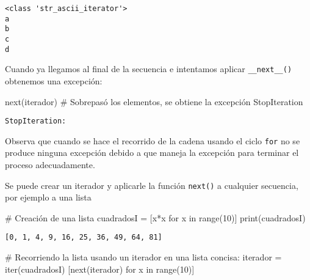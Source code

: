\documentclass[
  letterpaper,
  DIV=11,
  numbers=noendperiod]{scrreprt}
\newenvironment{Shaded}{\begin{snugshade}}{\end{snugshade}}
\newcommand{\BuiltInTok}[1]{\textcolor[rgb]{0.00,0.23,0.31}{#1}}
\newcommand{\CommentTok}[1]{\textcolor[rgb]{0.37,0.37,0.37}{#1}}
\newcommand{\ControlFlowTok}[1]{\textcolor[rgb]{0.00,0.23,0.31}{#1}}
\newcommand{\DecValTok}[1]{\textcolor[rgb]{0.68,0.00,0.00}{#1}}
\newcommand{\KeywordTok}[1]{\textcolor[rgb]{0.00,0.23,0.31}{#1}}
\newcommand{\NormalTok}[1]{\textcolor[rgb]{0.00,0.23,0.31}{#1}}
\newcommand{\OperatorTok}[1]{\textcolor[rgb]{0.37,0.37,0.37}{#1}}
\begin{document}
\begin{verbatim}
<class 'str_ascii_iterator'>
a
b
c
d
\end{verbatim}

Cuando ya llegamos al final de la secuencia e intentamos aplicar
\texttt{\_\_next\_\_()} obtenemos una excepción:

\begin{Shaded}
\begin{Highlighting}[]
\BuiltInTok{next}\NormalTok{(iterador) }\CommentTok{\# Sobrepasó los elementos, se obtiene la excepción StopIteration}
\end{Highlighting}
\end{Shaded}

\begin{verbatim}
StopIteration: 
\end{verbatim}

Observa que cuando se hace el recorrido de la cadena usando el ciclo
\texttt{for} no se produce ninguna excepción debido a que maneja la
excepción para terminar el proceso adecuadamente.

Se puede crear un iterador y aplicarle la función \texttt{next()} a
cualquier secuencia, por ejemplo a una lista

\begin{Shaded}
\begin{Highlighting}[]
\CommentTok{\# Creación de una lista}
\NormalTok{cuadradosI }\OperatorTok{=}\NormalTok{ [x}\OperatorTok{*}\NormalTok{x }\ControlFlowTok{for}\NormalTok{ x }\KeywordTok{in} \BuiltInTok{range}\NormalTok{(}\DecValTok{10}\NormalTok{)]}
\BuiltInTok{print}\NormalTok{(cuadradosI)}
\end{Highlighting}
\end{Shaded}

\begin{verbatim}
[0, 1, 4, 9, 16, 25, 36, 49, 64, 81]
\end{verbatim}

\begin{Shaded}
\begin{Highlighting}[]
\CommentTok{\# Recorriendo la lista usando un iterador en una lista concisa:}
\NormalTok{iterador }\OperatorTok{=} \BuiltInTok{iter}\NormalTok{(cuadradosI)}
\NormalTok{[}\BuiltInTok{next}\NormalTok{(iterador) }\ControlFlowTok{for}\NormalTok{ x }\KeywordTok{in} \BuiltInTok{range}\NormalTok{(}\DecValTok{10}\NormalTok{)]}
\end{Highlighting}
\end{Shaded}
\end{document}
